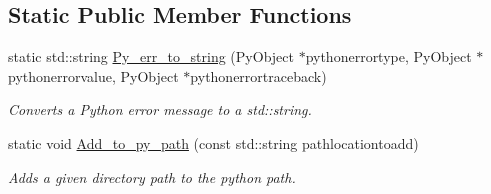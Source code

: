 \subsection*{Static Public Member Functions}
\begin{DoxyCompactItemize}
\item 
static std\+::string \hyperlink{classjetfuel_1_1inspire_1_1Python__module__loader_a50d20a6fcd26caf7aa1ece5c479bbc01}{Py\+\_\+err\+\_\+to\+\_\+string} (Py\+Object $\ast$pythonerrortype, Py\+Object $\ast$pythonerrorvalue, Py\+Object $\ast$pythonerrortraceback)
\begin{DoxyCompactList}\small\item\em Converts a Python error message to a std\+::string. \end{DoxyCompactList}\item 
static void \hyperlink{classjetfuel_1_1inspire_1_1Python__module__loader_ad8cf860545d85af78f7cc82d4e889840}{Add\+\_\+to\+\_\+py\+\_\+path} (const std\+::string pathlocationtoadd)
\begin{DoxyCompactList}\small\item\em Adds a given directory path to the python path. \end{DoxyCompactList}\end{DoxyCompactItemize}

